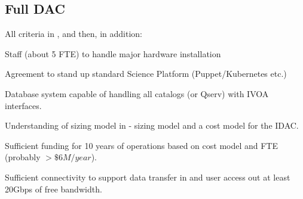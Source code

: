 \subsection{Full DAC} \label{sec:fullDAC}
All criteria in , and then, in addition:
\begin{todolist}
\item Staff (about 5 FTE) to handle major hardware installation
\item Agreement to stand up standard Science Platform (Puppet/Kubernetes etc.)
\item Database system capable of handling all catalogs (or Qserv) with IVOA  interfaces.
\item Understanding of sizing model in  - sizing model and a cost model for the IDAC.
\item Sufficient funding for 10 years of operations  based on cost model and FTE (probably $>\$6M/year$).
\item Sufficient connectivity to support data transfer in and user access out at least 20Gbps of free bandwidth.
\end{todolist}
